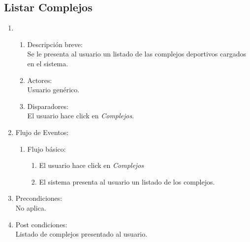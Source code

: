 \documentclass[a4paper,11pt]{article}
\begin{document}
\subsection{Listar Complejos}
\begin{enumerate}
    \item
    \begin{enumerate}
    \item Descripci\'on breve: \\
        Se le presenta al usuario un listado de las complejos deportivos cargados en el sistema.
    \item Actores: \\
        Usuario gen\'erico.
    \item Disparadores: \\
        El usuario hace click en \emph{Complejos}.
    \end{enumerate}

    \item Flujo de Eventos: 

    \begin{enumerate}
        \item Flujo b\'asico:
        \begin{enumerate}
            \item El usuario hace click en \emph{Complejos}
            \item El sistema presenta al usuario un listado de los complejos.
        \end{enumerate}
    \end{enumerate}

    \item Precondiciones: \\
        No aplica.

    \item Post condiciones: \\
        Listado de complejos presentado al usuario.

\end{enumerate}

\end{document}
